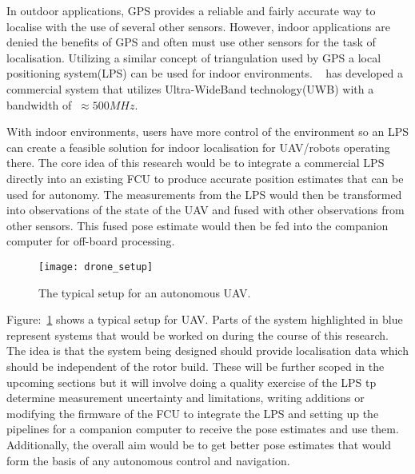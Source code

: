 In outdoor applications, GPS provides a reliable and fairly accurate way to localise with the use of several other sensors.
    However, indoor applications are denied the benefits of GPS and often must use other sensors for the task of localisation.
    Utilizing a similar concept of triangulation used by GPS a local positioning system(LPS) can be used for indoor environments.
    ~\citep{pozyx2018pozyx} has developed a commercial system that utilizes Ultra-WideBand technology(UWB) with a bandwidth of $~\approx 500MHz$.

With indoor environments, users have more control of the environment so an LPS can create a feasible solution for indoor localisation for UAV/robots operating there.
    The core idea of this research would be to integrate a commercial LPS directly into an existing FCU to produce accurate position estimates that can be used for autonomy.
    The measurements from the LPS would then be transformed into observations of the state of the UAV and fused with other observations from other sensors.
    This fused pose estimate would then be fed into the companion computer for off-board processing.
    \begin{figure}[h!]
        \centering
        \texttt{[image: drone\_setup]}
        \caption{The typical setup for an autonomous UAV.}
        \label{fig:ds}
    \end{figure}

    Figure:~\ref{fig:ds} shows a typical setup for UAV.
    Parts of the system highlighted in blue represent systems that would be worked on during the course of this research.
    The idea is that the system being designed should provide localisation data which should be independent of the rotor build.
    These will be further scoped in the upcoming sections but it will involve doing a quality exercise of the LPS tp determine measurement uncertainty and limitations,
    writing additions or modifying the firmware of the FCU to integrate the LPS and setting up the pipelines for a companion computer to receive the pose estimates and use them.
    Additionally, the overall aim would be to get better pose estimates that would form the basis of any autonomous control and navigation.


